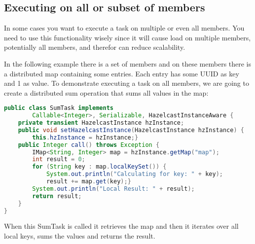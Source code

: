 \subsection{Executing on all or subset of members}
In some cases you want to execute a task on multiple or even all members. You need to use this functionality wisely since it will cause load on multiple members, potentially all members, and therefor can reduce scalability.

In the following example there is a set of members and on these members there is a distributed map containing some entries. Each entry has some UUID as key and 1 as value. To demonstrate executing a task on all members, we are going to create a distributed sum operation that sums all values in the map:
\begin{lstlisting}[language=java]
public class SumTask implements
        Callable<Integer>, Serializable, HazelcastInstanceAware {
    private transient HazelcastInstance hzInstance;
    public void setHazelcastInstance(HazelcastInstance hzInstance) {
        this.hzInstance = hzInstance;}
    public Integer call() throws Exception {
        IMap<String, Integer> map = hzInstance.getMap("map");
        int result = 0;
        for (String key : map.localKeySet()) {
            System.out.println("Calculating for key: " + key);
            result += map.get(key);}
        System.out.println("Local Result: " + result);
        return result;
    }
}
\end{lstlisting}
When this SumTask is called it retrieves the map and then it iterates over all local keys, sums the values and returns the result.

